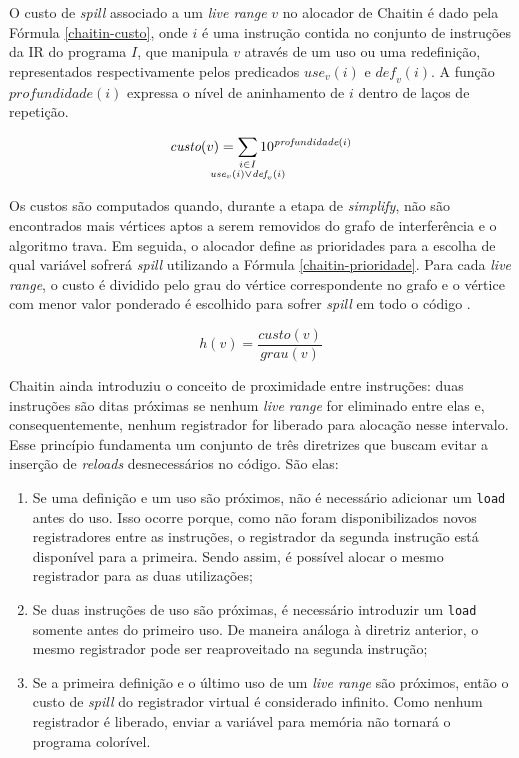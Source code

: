 \documentclass[
	12pt,				%
	openright,			%
	twoside,			%
	a4paper,			%
	tcc,			%
	]{ABNT-DC-UEL}
\begin{document}
O custo de \textit{spill} associado a um \textit{live range} $v$ no alocador de Chaitin é dado pela Fórmula \ref{chaitin-custo}, onde $i$ é uma instrução contida no conjunto de instruções da IR do programa $I$, que manipula $v$ através de um uso ou uma redefinição, representados respectivamente pelos predicados $\mathit{use}_v(i)$ e $\mathit{def}_v(i)$. A função $\mathit{profundidade} (i)$ expressa o nível de aninhamento de $i$ dentro de laços de repetição. 

\begin{equation}
    \textit{custo}(v) = \sum_{\mathclap{\substack{i \in I\\\textit{use}_v(i) \lor \textit{def}_v(i)}}} 10 ^ {\textit{profundidade}(i)}
    \label{chaitin-custo}
\end{equation}

Os custos são computados quando, durante a etapa de \textit{simplify}, não são encontrados mais vértices aptos a serem removidos do grafo de interferência e o algoritmo trava. Em seguida, o alocador define as prioridades para a escolha de qual variável sofrerá \textit{spill} utilizando a Fórmula \ref{chaitin-prioridade}. Para cada \textit{live range}, o custo é dividido pelo grau do vértice correspondente no grafo e o vértice com menor valor ponderado é escolhido para sofrer \textit{spill} em todo o código \cite{bernstein:89}.

\begin{equation}
    h(v) = \frac{\textit{custo}(v)}{\textit{grau}(v)}
    \label{chaitin-prioridade}
\end{equation}

Chaitin \cite{chaitin:82} ainda introduziu o conceito de proximidade entre instruções: duas instruções são ditas próximas se nenhum \textit{live range} for eliminado entre elas e, consequentemente, nenhum registrador for liberado para alocação nesse intervalo. Esse princípio fundamenta um conjunto de três diretrizes que buscam evitar a inserção de \textit{reloads} desnecessários no código. São elas:
\begin{enumerate}
    \item Se uma definição e um uso são próximos, não é necessário adicionar um \texttt{load} antes do uso. Isso ocorre porque, como não foram disponibilizados novos registradores entre as instruções, o registrador da segunda instrução está disponível para a primeira. Sendo assim, é possível alocar o mesmo registrador para as duas utilizações;
    \item Se duas instruções de uso são próximas, é necessário introduzir um \texttt{load} somente antes do primeiro uso. De maneira análoga à diretriz anterior, o mesmo registrador pode ser reaproveitado na segunda instrução;
    \item Se a primeira definição e o último uso de um \textit{live range} são próximos, então o custo de \textit{spill} do registrador virtual é considerado infinito. Como nenhum registrador é liberado, enviar a variável para memória não tornará o programa colorível.
\end{enumerate}
    
\end{document}
